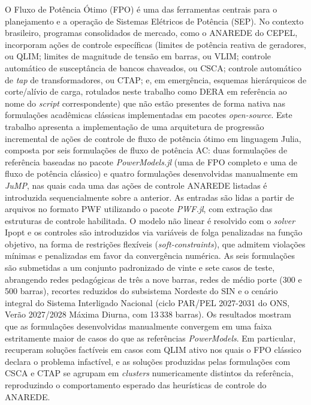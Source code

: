 O Fluxo de Potência Ótimo (FPO) é uma das ferramentas centrais para o planejamento e a operação de Sistemas Elétricos de Potência (SEP). No contexto brasileiro, programas consolidados de mercado, como o ANAREDE do CEPEL, incorporam ações de controle específicas (limites de potência reativa de geradores, ou QLIM; limites de magnitude de tensão em barras, ou VLIM; controle automático de susceptância de bancos chaveados, ou CSCA; controle automático de \textit{tap} de transformadores, ou CTAP; e, em emergência, esquemas hierárquicos de corte/alívio de carga, rotulados neste trabalho como DERA em referência ao nome do \textit{script} correspondente) que não estão presentes de forma nativa nas formulações acadêmicas clássicas implementadas em pacotes \textit{open-source}. Este trabalho apresenta a implementação de uma arquitetura de progressão incremental de ações de controle de fluxo de potência ótimo em linguagem Julia, composta por seis formulações de fluxo de potência AC: duas formulações de referência baseadas no pacote \textit{PowerModels.jl} (uma de FPO completo e uma de fluxo de potência clássico) e quatro formulações desenvolvidas manualmente em \textit{JuMP}, nas quais cada uma das ações de controle ANAREDE listadas é introduzida sequencialmente sobre a anterior. As entradas são lidas a partir de arquivos no formato PWF utilizando o pacote \textit{PWF.jl}, com extração das estruturas de controle habilitada. O modelo não linear é resolvido com o \textit{solver} Ipopt e os controles são introduzidos via variáveis de folga penalizadas na função objetivo, na forma de restrições flexíveis (\textit{soft-constraints}), que admitem violações mínimas e penalizadas em favor da convergência numérica. As seis formulações são submetidas a um conjunto padronizado de vinte e sete casos de teste, abrangendo redes pedagógicas de três a nove barras, redes de médio porte (300 e 500 barras), recortes reduzidos do subsistema Nordeste do SIN e o cenário integral do Sistema Interligado Nacional (ciclo PAR/PEL 2027-2031 do ONS, Verão 2027/2028 Máxima Diurna, com 13\,338 barras). Os resultados mostram que as formulações desenvolvidas manualmente convergem em uma faixa estritamente maior de casos do que as referências \textit{PowerModels}. Em particular, recuperam soluções factíveis em casos com QLIM ativo nos quais o FPO clássico declara o problema infactível, e as soluções produzidas pelas formulações com CSCA e CTAP se agrupam em \textit{clusters} numericamente distintos da referência, reproduzindo o comportamento esperado das heurísticas de controle do ANAREDE.

